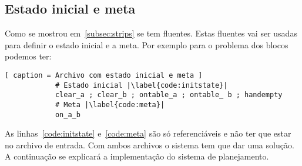 \subsection{Estado inicial e meta}
	Como se mostrou em~\ref{subsec:strips} se tem fluentes. Estas fluentes vai ser usadas para definir o estado inicial e a meta. Por exemplo para o problema dos blocos podemos ter:
		\begin{lstlisting}[ caption = Archivo com estado inicial e meta ]
			# Estado inicial |\label{code:initstate}|
			clear_a ; clear_b ; ontable_a ; ontable_ b ; handempty
			# Meta |\label{code:meta}|
			on_a_b
		\end{lstlisting}
	As linhas~\ref{code:initstate} e~\ref{code:meta} são só referenciáveis e não ter que estar no archivo de entrada.
	Com ambos archivos o sistema tem que dar uma solução. A continuação se explicará a implementação do sistema de planejamento.